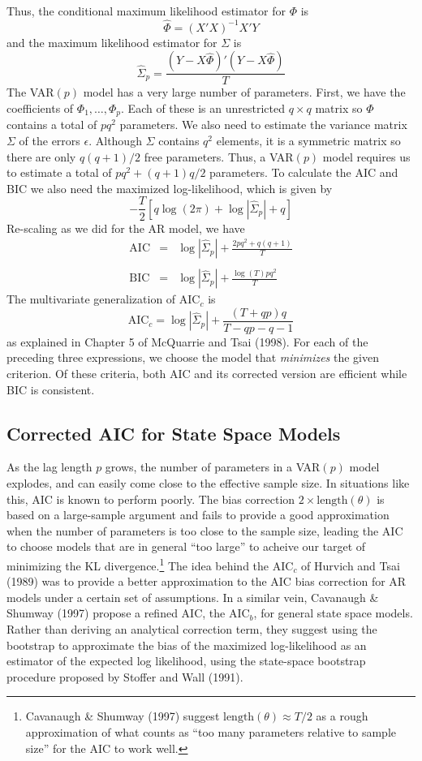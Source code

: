 \documentclass[12pt]{article}
\theoremstyle{definition}
\begin{document}
Thus, the conditional maximum likelihood estimator for $\Phi$ is
	$$\widehat{\Phi} = (X'X)^{-1} X'Y$$
and the maximum likelihood estimator for $\Sigma$ is
	$$\widehat{\Sigma}_p = \frac{\left(Y - X\widehat{\Phi}\right)'\left(Y - X\widehat{\Phi}\right)}{T}$$
The VAR$(p)$ model has a very large number of parameters. First, we have the coefficients of $\Phi_1, \hdots, \Phi_p$. Each of these is an unrestricted $q\times q$ matrix so $\Phi$ contains a total of $pq^2$ parameters. We also need to estimate the variance matrix $\Sigma$ of the errors $\epsilon$. Although $\Sigma$ contains $q^2$ elements, it is a symmetric matrix so there are only $q(q+1)/2$ free parameters. Thus, a VAR$(p)$ model requires us to estimate a total of $pq^2 + (q+1)q/2$ parameters. To calculate the AIC and BIC we also need the maximized log-likelihood, which is given by
	$$-\frac{T}{2} \left[q\log(2\pi) + \log \left| \widehat{\Sigma}_p\right| + q\right]$$
Re-scaling as we did for the AR model, we have
\begin{eqnarray*}
	\mbox{AIC} &=& \log \left| \widehat{\Sigma}_p\right| + \frac{2pq^2 + q(q+1)}{T}\\ \\
	\mbox{BIC} &=& \log \left| \widehat{\Sigma}_p\right| +  \frac{\log(T)pq^2}{T}
\end{eqnarray*}
The multivariate generalization of AIC$_c$ is
$$\mbox{AIC}_c = \log \left| \widehat{\Sigma}_p\right|  + \frac{(T + qp)q}{T - qp - q -1}$$
as explained in Chapter 5 of McQuarrie and Tsai (1998). For each of the preceding three expressions, we choose the model that \emph{minimizes} the given criterion. Of these criteria, both AIC and its corrected version are efficient while BIC is consistent. 

\subsection{Corrected AIC for State Space Models}
As the lag length $p$ grows, the number of parameters in a VAR$(p)$ model explodes, and can easily come close to the effective sample size. In situations like this, AIC is known to perform poorly. The bias correction $2\times \mbox{length}(\theta)$ is based on a large-sample argument and fails to provide a good approximation when the number of parameters is too close to the sample size, leading the AIC to choose models that are in general ``too large'' to acheive our target of minimizing the KL divergence.\footnote{Cavanaugh \& Shumway (1997) suggest $\mbox{length}(\theta) \approx T/2$ as a rough approximation of what counts as ``too many parameters relative to sample size'' for the AIC to work well.} The idea behind the AIC$_c$ of Hurvich and Tsai (1989) was to provide a better approximation to the AIC bias correction for AR models under a certain set of assumptions. In a similar vein, Cavanaugh \& Shumway (1997) propose a refined AIC, the AIC$_b$, for general state space models. Rather than deriving an analytical correction term, they suggest using the bootstrap to approximate the bias of the maximized log-likelihood as an estimator of the expected log likelihood, using the state-space bootstrap procedure proposed by Stoffer and Wall (1991).  
\end{document}
